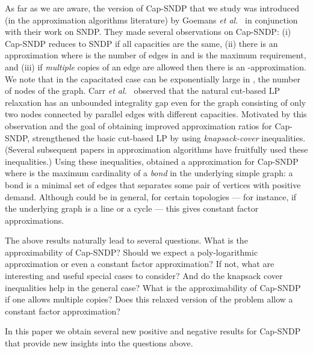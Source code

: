 \documentclass[11pt]{article}
\newcounter{thm0Rcopies}
\newcounter{thm_saved}
\newcommand{\etal}{{\em et al.}\ }
\begin{document}
As far as we are aware, the version of Cap-SNDP that we study was
introduced (in the approximation algorithms literature) by Goemans
\etal \cite{GG+} in conjunction with their work on SNDP. They made
several observations on Cap-SNDP: (i) Cap-SNDP reduces to SNDP if all
capacities are the same, (ii) there is an 
approximation where  is the number of edges in  and  is the maximum requirement, and (iii) if {\em
  multiple} copies of an edge are allowed then there is an -approximation.  We note that in the capacitated case
 can be exponentially large in , the number of nodes of
the graph. Carr \etal \cite{CFLP} observed that the natural cut-based
LP relaxation has an unbounded integrality gap even for the graph
consisting of only two nodes  connected by parallel edges with
different capacities. Motivated by this observation and the goal of
obtaining improved approximation ratios for Cap-SNDP, \cite{CFLP}
strengthened the basic cut-based LP by using {\em knapsack-cover}
inequalities. (Several subsequent papers in approximation algorithms
have fruitfully used these inequalities.) Using these inequalities,
\cite{CFLP} obtained a  approximation for Cap-SNDP where
 is the maximum cardinality of a \emph{bond} in the
underlying simple graph: a bond is a minimal set of edges that
separates some pair of vertices with positive demand. Although
 could be  in general, for certain topologies
--- for instance, if the underlying graph is a line or a cycle ---
this gives constant factor approximations.

The above results naturally lead to several questions.  What is the
approximability of Cap-SNDP? Should we expect a poly-logarithmic
approximation or even a constant factor approximation?  If not, what
are interesting and useful special cases to consider?  And do the
knapsack cover inequalities help in the general case?  What is the
approximability of Cap-SNDP if one allows multiple copies? Does this
relaxed version of the problem allow a constant factor
approximation?

In this paper we obtain several new positive and negative results for 
Cap-SNDP that provide new insights into the questions above.

\iffalse

In this paper, we also study the so called {\em soft capacity} version
of Cap-SNDP.  In this version, each edge  can be bought any number
of times; that is, one can pay cost  to get a capacity of
, for any positive integer . Such a variant is natural
in some application settings; for example, one may be able to
simultaneously lay down multiple copies of a telecommunications cable
across two nodes.  We will sometimes call the original version of the
problem one with {\em hard} capacities, when we want to make a
distinction between the two versions.
\fi
\end{document}
